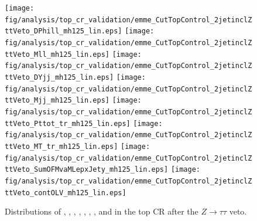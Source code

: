 \begin{table}
\begin{center}
\renewcommand{\arraystretch}{1.2}
\caption[Cutflow in top CR.]{\ttbar, ST, non-top background, and data
        event counts in the top control region. Yields are shown at
        each cutflow stage}
\label{chap:analysis:tab:top_cr_cutflow}
\end{center}
\end{table}

\begin{figure}[h]
  \centering
   \texttt{[image: fig/analysis/top\_cr\_validation/emme\_CutTopControl\_2jetinclZttVeto\_DPhill\_mh125\_lin.eps]}
   \texttt{[image: fig/analysis/top\_cr\_validation/emme\_CutTopControl\_2jetinclZttVeto\_Mll\_mh125\_lin.eps]}
   \texttt{[image: fig/analysis/top\_cr\_validation/emme\_CutTopControl\_2jetinclZttVeto\_DYjj\_mh125\_lin.eps]}
   \texttt{[image: fig/analysis/top\_cr\_validation/emme\_CutTopControl\_2jetinclZttVeto\_Mjj\_mh125\_lin.eps]}
   \texttt{[image: fig/analysis/top\_cr\_validation/emme\_CutTopControl\_2jetinclZttVeto\_Pttot\_tr\_mh125\_lin.eps]}
   \texttt{[image: fig/analysis/top\_cr\_validation/emme\_CutTopControl\_2jetinclZttVeto\_MT\_tr\_mh125\_lin.eps]}
   \texttt{[image: fig/analysis/top\_cr\_validation/emme\_CutTopControl\_2jetinclZttVeto\_SumOFMvaMLepxJety\_mh125\_lin.eps]}
   \texttt{[image: fig/analysis/top\_cr\_validation/emme\_CutTopControl\_2jetinclZttVeto\_contOLV\_mh125\_lin.eps]}
   \caption{Distributions
   of \dphill, \mll, \dyjj, \mjj, \pTtot, \mT, \SumMlj, and \lepEtaCent
   in the \emme top CR after the $Z\rightarrow{\tau\tau}$ veto.}
  \label{chap:analysis:fig:bdt_inputs_topcr_df}
\end{figure}

